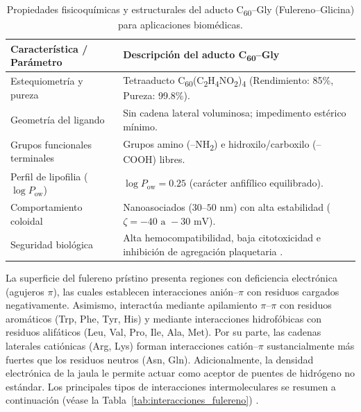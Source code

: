 \begin{table}[H]
\centering
\caption{Propiedades fisicoquímicas y estructurales del aducto C\textsubscript{60}--Gly (Fulereno--Glicina) para aplicaciones biomédicas.}
\label{tab:aplicaciones_fulereno}
\begin{tabular}{l p{10cm}}
\toprule
\textbf{Característica / Parámetro} & \textbf{Descripción del aducto C\textsubscript{60}--Gly} \\
\midrule
Estequiometría y pureza & Tetraaducto C\textsubscript{60}(C\textsubscript{2}H\textsubscript{4}NO\textsubscript{2})\textsubscript{4} (Rendimiento: 85\%, Pureza: 99.8\%).\\
Geometría del ligando & Sin cadena lateral voluminosa; impedimento estérico mínimo. \\
Grupos funcionales terminales & Grupos amino (--NH\textsubscript{2}) e hidroxilo/carboxilo (--COOH) libres. \\
Perfil de lipofilia ($\log P_{\text{ow}}$) & $\log P_{\text{ow}} = 0.25$ (carácter anfifílico equilibrado). \\
Comportamiento coloidal & Nanoasociados ($30\text{--}50\text{ nm}$) con alta estabilidad ($\zeta = -40\text{ a }-30\text{ mV}$). \\
Seguridad biológica & Alta hemocompatibilidad, baja citotoxicidad e inhibición de agregación plaquetaria  \cite{sharoyko2024modification}. \\
\bottomrule
\end{tabular}
\end{table}

La superficie del fulereno prístino presenta regiones con deficiencia electrónica (agujeros $\pi$), las cuales establecen interacciones anión--$\pi$ con residuos cargados negativamente. Asimismo, interactúa mediante apilamiento $\pi$--$\pi$ con residuos aromáticos (Trp, Phe, Tyr, His) y mediante interacciones hidrofóbicas con residuos alifáticos (Leu, Val, Pro, Ile, Ala, Met). Por su parte, las cadenas laterales catiónicas (Arg, Lys) forman interacciones catión--$\pi$ sustancialmente más fuertes que los residuos neutros (Asn, Gln). Adicionalmente, la densidad electrónica de la jaula le permite actuar como aceptor de puentes de hidrógeno no estándar. %
 Los principales tipos de interacciones intermoleculares se resumen a continuación (véase la Tabla~\ref{tab:interacciones_fulereno}) \cite{bolshakova2023facile}.


